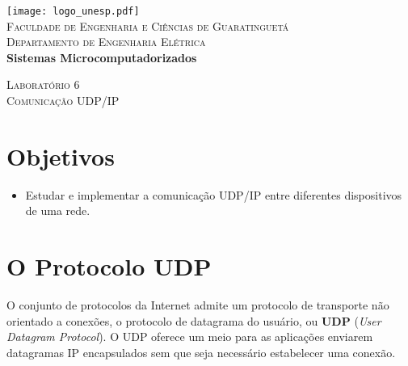 \documentclass[12pt]{article}
\title{\doctitle}
\author{\docauthor}
\def\doctitle{Comunicação UDP/IP}
\def\labnumber{6}
\def\docsubj{Sistemas Microcomputadorizados}
\begin{document}

\begin{titlepage}
  \centering
  \vspace*{0.5 cm}
  \texttt{[image: logo\_unesp.pdf]}\\[2.0 cm] %
  \textsc{\large Faculdade de Engenharia e Ciências de Guaratinguetá}\\[0.3cm]
  \textsc{\large Departamento de Engenharia Elétrica}\\[3.0cm]
  { \LARGE \bfseries \docsubj }\\

  \vspace{5cm}

  \textsc{\large Laboratório \labnumber}\\
  \vspace{1cm}
  \textsc{\large \doctitle}

\end{titlepage}


{
  \hypersetup{hidelinks}
  \tableofcontents
}

\newpage


\section{Objetivos}

\begin{itemize}
  \item Estudar e implementar a comunicação UDP/IP entre diferentes dispositivos de
    uma rede.
\end{itemize}

\section{O Protocolo UDP}

O conjunto de protocolos da Internet admite um protocolo de transporte não orientado
a conexões, o protocolo de datagrama do usuário, ou \textbf{UDP} (\textit{User
Datagram Protocol}). O UDP oferece um meio para as aplicações enviarem datagramas IP
encapsulados sem que seja necessário estabelecer uma conexão.
\end{document}
